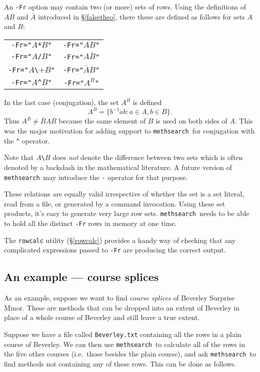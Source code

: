 \documentclass[a4paper,11pt,oneside]{book}
\makeatletter
\def\textitidx#1{\textit{#1}\index{#1}}
\newcommand{\ttcmdidx}[1]{\texttt{#1}\index{#1@{\texttt{#1}}}}
\def\methsearch{\texttt{meth\-search}}
\newcommand{\sref}[1]{\hyperref[#1]{\S\ref{#1}}}
\makeatother
\begin{document}
An \verb+-Fr+ option may contain two (or more) sets of rows.  Using
the definitions of $AB$ and $\bar{A}$ introduced in \sref{falsetheo}, 
there these are defined as follows for sets $A$ and $B$:

\begin{tabular}{c@{$\quad\iff\quad$}c}
\verb+-Fr="+$A$\verb+*+$B$\verb+"+  &  \verb+-Fr="+$A B$\verb+"+ \\
\verb+-Fr="+$A$\verb+/+$B$\verb+"+  &  \verb+-Fr="+$A \bar{B}$\verb+"+ \\
\verb+-Fr="+$A$\verb+\+$B$\verb+"+  &  \verb+-Fr="+$\bar{A} B$\verb+"+ \\
\verb+-Fr="+$A$\verb+^+$B$\verb+"+  &  \verb+-Fr="+$A^B$\verb+"+ \\
\end{tabular}

In the last case (conjugation), the set $A^B$ is defined
\[ A^B = \{ b^{-1} a b : a \in A, b \in B \}. \]
Thus $A^B \not= \bar{B}AB$ because the same element of $B$ is used on both
sides of $A$.  This was the major motivation for adding support to 
\methsearch\ for conjugation with the \verb+^+ operator.

Note that $A$\verb+\+$B$ does \textit{not} denote the difference
between two sets which is often denoted by a backslash in the mathematical
literature.  
A future version of \methsearch\ may introduce the \verb+-+ operator for
that purpose.

These relations are equally valid irrespective of whether the set is a 
set literal, read from a file, or generated by a command invocation.
Using these set products, it's easy to generate very large row sets.  
\methsearch\ needs to be able to hold all the distinct \verb+-Fr+ rows 
in memory at one time.

The \ttcmdidx{rowcalc} utility (\sref{rowcalc}) provides a handy way 
of checking that any complicated expressions passed to \verb+-Fr+
are producing the correct output.

\subsection{An example — course splices}

As an example, suppose we want to find \textitidx{course splices} of
Beverley Surprise Minor.  These are methods that can be dropped into an
extent of Beverley in place of a whole course of Beverley and still 
leave a true extent.

Suppose we have a file called \verb+Beverley.txt+ containing all the rows in 
a plain course of Beverley.  We can then use \methsearch\ to calculate
all of the rows in the five other courses (i.e.\ those besides the plain 
course), and ask \methsearch\ to find methods not containing any of these
rows.  This can be done as follows.
\end{document}
